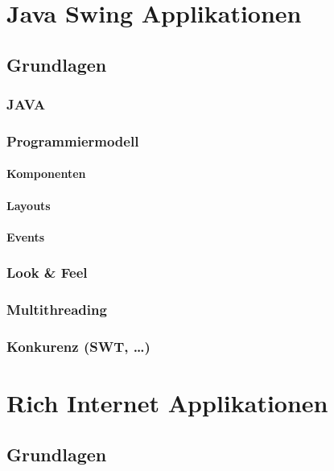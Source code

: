 \documentclass[
11pt, %
a4paper, %
BCOR25mm, %
DIV14, %
footsepline = false, %
headsepline, %
twoside, %
openright,
abstracton, %
listof=totocnumbered, %
bibliography=totocnumbered %
]{scrreprt}
\begin{document}
  \chapter{Java Swing Applikationen}

  \section{Grundlagen}
  
  \subsection{JAVA}
  
  \subsection{Programmiermodell}
  
  \subsubsection{Komponenten}
  
  \subsubsection{Layouts}
    
  \subsubsection{Events}
  
  \subsection{Look \& Feel}
  
  \subsection{Multithreading}
  
  \subsection{Konkurenz (SWT, \ldots)}
  
  \chapter{Rich Internet Applikationen}
  
  \section{Grundlagen}
\end{document}

